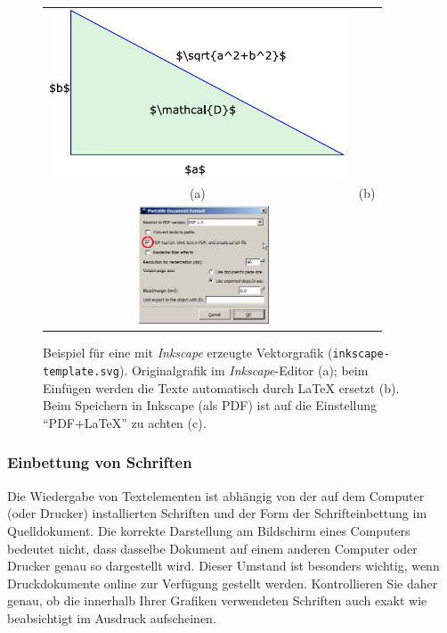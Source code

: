 \begin{figure}
\centering\small
\begin{tabular}{cc}
\includegraphics[scale=1.0]{inkscape-template-orig} &

\\
(a) & (b)
\\[6pt]
\multicolumn{2}{c}{\includegraphics[width=0.4\textwidth]{inkscape-pdf-save-screenhot}%
~~\raisebox{25mm}{(c)}}
\end{tabular}
\caption{Beispiel für eine mit \emph{Inkscape} erzeugte Vektorgrafik
(\nolinkurl{inkscape-template.svg}).
Originalgrafik im \textit{Inkscape}-Editor (a);
beim Einfügen werden die Texte automatisch durch LaTeX ersetzt (b).
Beim Speichern in Inkscape (als PDF) ist auf die Einstellung "`PDF+LaTeX"' zu achten (c).}
\label{fig:InkscapeExample}
\end{figure}


\subsubsection{Einbettung von Schriften}

Die Wiedergabe von Textelementen ist abhängig von der auf dem
Computer (oder Drucker) installierten Schriften und der Form der
Schrifteinbettung im Quelldokument. Die korrekte Darstellung am
Bildschirm eines Computers bedeutet nicht, dass dasselbe Dokument
auf einem anderen Computer oder Drucker genau so dargestellt wird.
Dieser Umstand ist besonders wichtig, wenn Druckdokumente online
zur Verfügung gestellt werden. Kontrollieren Sie daher genau, ob
die innerhalb Ihrer Grafiken verwendeten Schriften auch exakt wie
beabsichtigt im Ausdruck aufscheinen.


